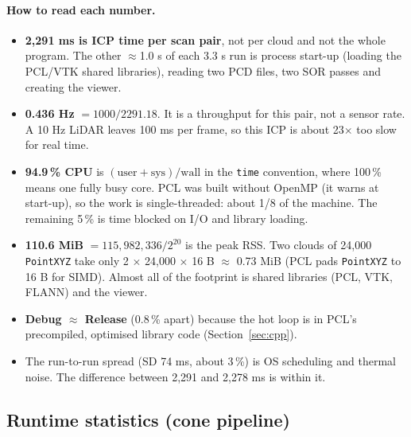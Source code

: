 \documentclass[10pt,a4paper]{scrartcl}
\renewcommand{\emph}[1]{\textcolor{accent}{#1}}
\newcommand{\code}[1]{\texttt{#1}}
\begin{document}
  \paragraph{How to read each number.}
  \begin{itemize}
    \item \textbf{2,291 ms is ICP time per scan pair}, not per cloud and not the whole
      program. The other $\approx$1.0 s of each 3.3 s run is process start-up (loading
      the PCL/VTK shared libraries), reading two PCD files, two SOR passes and creating
      the viewer.
    \item \textbf{0.436 Hz} $=1000/2291.18$. It is a throughput for this pair, not a
      sensor rate. A 10 Hz LiDAR leaves 100 ms per frame, so this ICP is about
      23$\times$ too slow for real time.
    \item \textbf{94.9\,\% CPU} is $(\text{user}+\text{sys})/\text{wall}$ in the
      \code{time} convention, where 100\,\% means \emph{one fully busy core}. PCL was built
      without OpenMP (it warns at start-up), so the work is single-threaded: about 1/8
      of the machine. The remaining 5\,\% is time blocked on I/O and library loading.
    \item \textbf{110.6 MiB} $=115{,}982{,}336/2^{20}$ is the peak RSS. Two clouds of
      24,000 \code{PointXYZ} take only 2 $\times$ 24,000 $\times$ 16 B $\approx$ 0.73 MiB (PCL
      pads \code{PointXYZ} to 16 B for SIMD). Almost all of the footprint is shared
      libraries (PCL, VTK, FLANN) and the viewer.
    \item \textbf{Debug $\approx$ Release} (0.8\,\% apart) because the hot loop is in PCL's
      precompiled, optimised library code (Section~\ref{sec:cpp}).
    \item The run-to-run spread (SD 74 ms, about 3\,\%) is OS scheduling and thermal
      noise. The difference between 2,291 and 2,278 ms is within it.
  \end{itemize}

  \subsection{Runtime statistics (cone pipeline)}
\end{document}
